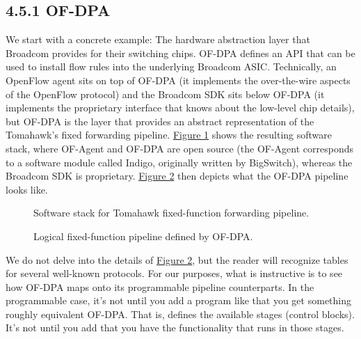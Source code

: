 \documentclass[letterpaper,11pt,english]{sphinxmanual}
\let\sphinxpxdimen\pdfpxdimen\else\newdimen\sphinxpxdimen
\begin{document}
\subsection{4.5.1 OF-DPA}
\label{\detokenize{switch:of-dpa}}
We start with a concrete example: The  hardware abstraction layer that Broadcom provides for their
switching chips. OF-DPA defines an API that can be used to install
flow rules into the underlying Broadcom ASIC. Technically, an OpenFlow
agent sits on top of OF-DPA (it implements the over-the-wire aspects
of the OpenFlow protocol) and the Broadcom SDK sits below OF-DPA (it
implements the proprietary interface that knows about the low-level
chip details), but OF-DPA is the layer that provides an abstract
representation of the Tomahawk’s fixed forwarding
pipeline. \hyperref[\detokenize{switch:fig-ofdpa1}]{Figure \ref{\detokenize{switch:fig-ofdpa1}}} shows the resulting
software stack, where OF-Agent and OF-DPA are open source (the
OF-Agent corresponds to a software module called Indigo, originally
written by BigSwitch), whereas the Broadcom SDK is
proprietary. \hyperref[\detokenize{switch:fig-ofdpa2}]{Figure \ref{\detokenize{switch:fig-ofdpa2}}} then depicts what the
OF-DPA pipeline looks like.

\begin{figure}[htbp]
\centering
\capstart

\noindent\sphinxincludegraphics[width=300\sphinxpxdimen]{{Slide15}.png}
\caption{Software stack for Tomahawk fixed-function forwarding pipeline.}\label{\detokenize{switch:id15}}\label{\detokenize{switch:fig-ofdpa1}}\end{figure}

\begin{figure}[htbp]
\centering
\capstart

\noindent\sphinxincludegraphics[width=650\sphinxpxdimen]{{ofdpa}.png}
\caption{Logical fixed-function pipeline defined by OF-DPA.}\label{\detokenize{switch:id16}}\label{\detokenize{switch:fig-ofdpa2}}\end{figure}

We do not delve into the details of \hyperref[\detokenize{switch:fig-ofdpa2}]{Figure \ref{\detokenize{switch:fig-ofdpa2}}},
but the reader will recognize tables for several well-known protocols.
For our purposes, what is instructive is to see how OF-DPA maps onto
its programmable pipeline counterparts. In the programmable case, it’s
not until you add a program like  that you get something
roughly equivalent OF-DPA. That is,  defines the available
stages (control blocks). It’s not until you add  that you
have the functionality that runs in those stages.
\end{document}
